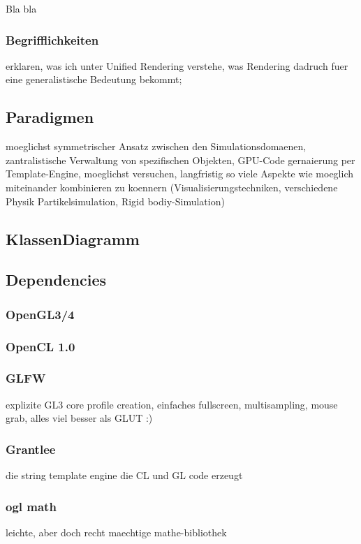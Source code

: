 Bla bla

\subsubsection{Begrifflichkeiten}
	erklaren, was ich unter Unified Rendering verstehe, was Rendering dadruch fuer eine generalistische Bedeutung bekommt;

\subsection{Paradigmen}
	
	moeglichst symmetrischer Ansatz zwischen den Simulationsdomaenen, zantralistische Verwaltung von spezifischen Objekten,
	GPU-Code gernaierung per Template-Engine, moeglichst versuchen, langfristig so viele Aspekte wie moeglich miteinander kombinieren zu koennern 	    
	(Visualisierungstechniken, verschiedene Physik Partikelsimulation, Rigid bodiy-Simulation) 

\subsection{KlassenDiagramm}

\subsection{Dependencies}

	
	\subsubsection{OpenGL3/4}
    \subsubsection{OpenCL 1.0}
    \subsubsection{GLFW}
    	explizite GL3 core profile creation, einfaches fullscreen, multisampling, mouse grab, alles viel besser als GLUT :)
    \subsubsection{Grantlee}
       die string template engine die CL und GL code erzeugt
    \subsubsection{ogl math}
    	leichte, aber doch recht maechtige mathe-bibliothek
    	
